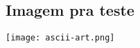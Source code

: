 
\subsection{Imagem pra teste}

\begin{center}
    \texttt{[image: ascii-art.png]}
    \centering\vspace{-3pt}\footnotesize\textit{}
\end{center}